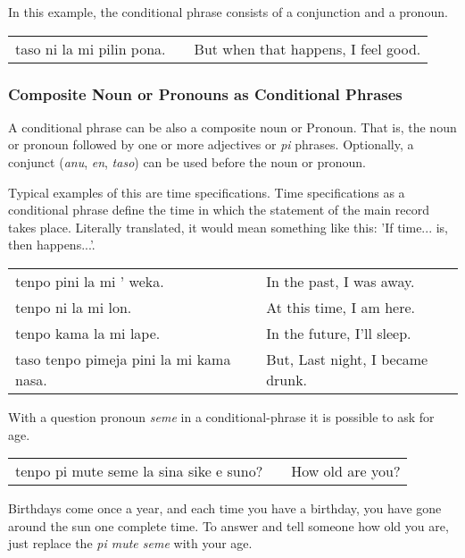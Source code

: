 In this example, the conditional phrase consists of a conjunction and a pronoun. 

\begin{supertabular}{p{5,5cm}|ll}
taso ni la mi pilin pona. && But when that happens, I feel good. \\
\end{supertabular} 

%
%
\subsubsection*{Composite Noun or Pronouns as Conditional Phrases}
%
%
A conditional phrase can be also a composite noun or Pronoun. 
That is, the noun or pronoun followed by one or more adjectives or \textit{pi} phrases.
Optionally, a conjunct (\textit{anu}, \textit{en}, \textit{taso}) can be used before the noun or pronoun. 

Typical examples of this are time specifications. 
Time specifications as a conditional phrase define the time in which the statement of the main record takes place. 
Literally translated, it would mean something like this: 'If time... is, then happens...'. 

\begin{supertabular}{p{5,5cm}|ll}
tenpo pini la mi ' weka. && In the past, I was away. \\
tenpo ni la mi lon. && At this time, I am here. \\
tenpo kama la mi lape. && In the future, I'll sleep. \\
taso tenpo pimeja pini la mi kama nasa. && But, Last night, I became drunk. \\
\end{supertabular} 

With a question pronoun \textit{seme} in a conditional-phrase it is possible to ask for age.

\begin{supertabular}{p{5,5cm}|ll}
tenpo pi mute seme la sina sike e suno? && How old are you? \\
\end{supertabular} 

Birthdays come once a year, and each time you have a birthday, you have gone around the sun one complete time. 
To answer and tell someone how old you are, just replace the \textit{pi mute seme} with your age.

